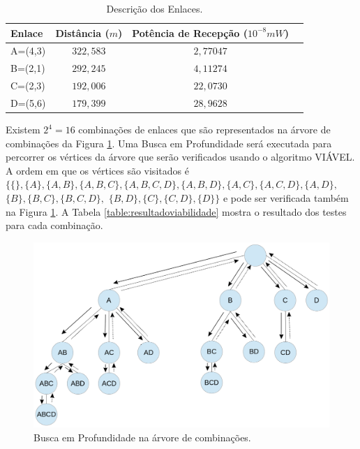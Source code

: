 \begin{table}[h]
\centering
\caption[Descrição dos Enlaces.]
{Descrição dos Enlaces.}
\label{table:enlaces}
\begin{tabular}{lccc}
\hline
Enlace & Distância ($m$) & Potência de Recepção ($10^{-8}mW$)\\ \hline
A=(4,3)	& $322,583$	& $2,77047$\\
B=(2,1)	& $292,245$	& $4,11274$\\
C=(2,3)	& $192,006$	& $22,0730$\\
D=(5,6)	& $179,399$	& $28,9628$
\end{tabular}
\end{table}

Existem $2^4 = 16$ combinações de enlaces que são representados na árvore de combinações da Figura \ref{fig:bp}. Uma Busca em Profundidade será executada para percorrer os vértices da árvore que serão verificados usando o algoritmo VIÁVEL. A ordem em que os vértices são visitados é $\{\{\}, \{A\}, \{A,B\}, \{A,B,C\}, \{A,B,C,D\}, \{A,B,D\}, \{A,C\}, \{A,C,D\}, \{A,D\},$ $\{B\}, \{B,C\}, \{B,C,D\},$ $\{B,D\}, \{C\}, \{C,D\}, \{D\}\}$ e pode ser verificada também na Figura \ref{fig:bp}. A Tabela \ref{table:resultadoviabilidade} mostra o resultado dos testes para cada combinação. 

\begin{figure}[htb]
\centering
\includegraphics[width=1\textwidth]{figs/bp}
\caption[Busca em Profundidade na árvore de combinações.]
{Busca em Profundidade na árvore de combinações.}
\label{fig:bp}
\end{figure}

